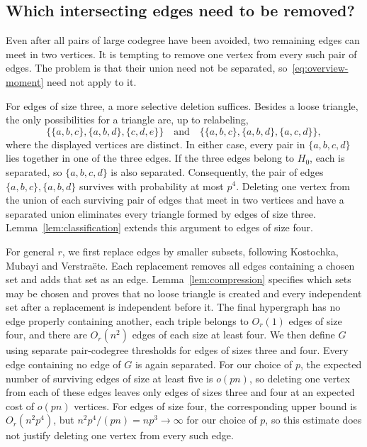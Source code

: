 \documentclass[11pt]{article}
\numberwithin{equation}{section}
\theoremstyle{remark}
\begin{document}
\subsection{Which intersecting edges need to be removed?}
Even after all pairs of large codegree have been avoided, two remaining edges can meet in two vertices. It is tempting to remove one vertex from every such pair of edges. The problem is that their union need not be separated, so~\eqref{eq:overview-moment} need not apply to it.

For edges of size three, a more selective deletion suffices. Besides a loose triangle, the only possibilities for a triangle are, up to relabeling,
\[
 \{\{a,b,c\},\{a,b,d\},\{c,d,e\}\}
 \quad\text{and}\quad
 \{\{a,b,c\},\{a,b,d\},\{a,c,d\}\},
\]
where the displayed vertices are distinct. In either case, every pair in $\{a,b,c,d\}$ lies together in one of the three edges. If the three edges belong to $H_0$, each is separated, so $\{a,b,c,d\}$ is also separated. Consequently, the pair of edges $\{a,b,c\},\{a,b,d\}$ survives with probability at most $p^4$. Deleting one vertex from the union of each surviving pair of edges that meet in two vertices and have a separated union eliminates every triangle formed by edges of size three. Lemma~\ref{lem:classification} extends this argument to edges of size four.

For general $r$, we first replace edges by smaller subsets, following Kostochka, Mubayi and Verstra\"ete. Each replacement removes all edges containing a chosen set and adds that set as an edge. Lemma~\ref{lem:compression} specifies which sets may be chosen and proves that no loose triangle is created and every independent set after a replacement is independent before it. The final hypergraph has no edge properly containing another, each triple belongs to $O_r(1)$ edges of size four, and there are $O_r(n^2)$ edges of each size at least four. We then define $G$ using separate pair-codegree thresholds for edges of sizes three and four. Every edge containing no edge of $G$ is again separated. For our choice of $p$, the expected number of surviving edges of size at least five is $o(pn)$, so deleting one vertex from each of these edges leaves only edges of sizes three and four at an expected cost of $o(pn)$ vertices. For edges of size four, the corresponding upper bound is $O_r(n^2p^4)$, but $n^2p^4/(pn)=np^3\to\infty$ for our choice of $p$, so this estimate does not justify deleting one vertex from every such edge.
\end{document}
